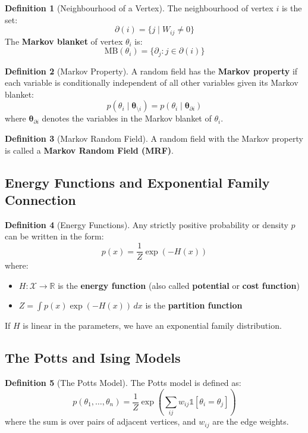 \documentclass[12pt,a4paper]{article}
\theoremstyle{definition}
\newtheorem{definition}{Definition}[section]
\begin{document}
\begin{definition}[Neighbourhood of a Vertex]
The neighbourhood of vertex $i$ is the set:
\[
\partial(i) = \{j \mid W_{ij} \neq 0\}
\]
The \textbf{Markov blanket} of vertex $\theta_i$ is:
\[
\text{MB}(\theta_i) = \{\partial_j : j \in \partial(i)\}
\]
\end{definition}

\begin{definition}[Markov Property]
A random field has the \textbf{Markov property} if each variable is conditionally independent of all other variables given its Markov blanket:
\[
p(\theta_i \mid \boldsymbol{\theta}_{\setminus i}) = p(\theta_i \mid \boldsymbol{\theta}_{\partial i})
\]
where $\boldsymbol{\theta}_{\partial i}$ denotes the variables in the Markov blanket of $\theta_i$.
\end{definition}

\begin{definition}[Markov Random Field]
A random field with the Markov property is called a \textbf{Markov Random Field (MRF)}.
\end{definition}

\subsection{Energy Functions and Exponential Family Connection}

\begin{definition}[Energy Functions]
Any strictly positive probability or density $p$ can be written in the form:
\[
p(x) = \frac{1}{Z} \exp(-H(x))
\]
where:
\begin{itemize}
    \item $H: \mathcal{X} \to \mathbb{R}$ is the \textbf{energy function} (also called \textbf{potential} or \textbf{cost function})
    \item $Z = \int p(x)\exp(-H(x))\, dx$ is the \textbf{partition function}
\end{itemize}

If $H$ is linear in the parameters, we have an exponential family distribution.
\end{definition}

\subsection{The Potts and Ising Models}

\begin{definition}[The Potts Model]
The Potts model is defined as:
\[
p(\theta_1, \ldots, \theta_n) = \frac{1}{Z} \exp\left(\sum_{ij} w_{ij} \mathbb{1}[\theta_i = \theta_j]\right)
\]
where the sum is over pairs of adjacent vertices, and $w_{ij}$ are the edge weights.
\end{definition}
\end{document}
